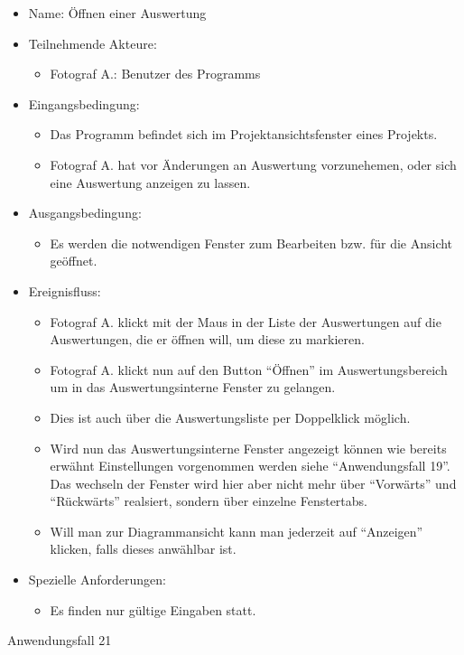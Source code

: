 \begin{itemize}
\begin{itemize}
\item Name: Öffnen einer Auswertung
\item Teilnehmende Akteure:
\begin{itemize}
\item Fotograf A.: Benutzer des Programms
\end{itemize}
\item Eingangsbedingung:
\begin{itemize}
\item Das Programm befindet sich im Projektansichtsfenster eines Projekts.
\item Fotograf A. hat vor Änderungen an Auswertung vorzunehemen, oder sich eine Auswertung anzeigen zu lassen.
\end{itemize}
\item Ausgangsbedingung:
\begin{itemize}
\item Es werden die notwendigen Fenster zum Bearbeiten bzw. für die Ansicht geöffnet.
\end{itemize}
\item Ereignisfluss:
\begin{itemize}
\item Fotograf A. klickt mit der Maus in der Liste der Auswertungen auf die Auswertungen, die er öffnen will, um diese zu markieren.
\item Fotograf A. klickt nun auf den Button "`Öffnen"' im Auswertungsbereich um in das Auswertungsinterne Fenster zu gelangen.
\item Dies ist auch über die Auswertungsliste per Doppelklick möglich.
\item Wird nun das Auswertungsinterne Fenster angezeigt können wie bereits erwähnt Einstellungen vorgenommen werden siehe "`Anwendungsfall 19"'. Das wechseln der Fenster wird hier aber nicht mehr über "`Vorwärts"' und "`Rückwärts"' realsiert, sondern über einzelne Fenstertabs.
\item Will man zur Diagrammansicht kann man jederzeit auf "`Anzeigen"' klicken, falls dieses anwählbar ist.
\end{itemize}
\item Spezielle Anforderungen:
\begin{itemize}
\item Es finden nur gültige Eingaben statt.
\end{itemize}
\end{itemize}
 
\begin{description}
\item[Anwendungsfall 21]
\end{description}
 

\end{itemize}
